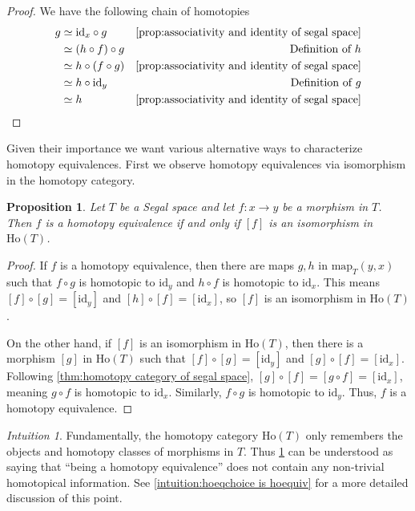 \documentclass[11pt, a4paper]{amsart}
\newcommand{\map}{\mathrm{map}}
\newcommand{\id}{\mathrm{id}}
\newcommand{\Ho}{\mathrm{Ho}}
\newtheorem{proposition}[equation]{Proposition}
\theoremstyle{definition}
\theoremstyle{remark}
\newtheorem{intuition}[equation]{Intuition}
\numberwithin{equation}{section}
\begin{document}
\begin{proof}
  We have the following chain of homotopies
  \begin{align*}
    g & \simeq \id_x \circ g  & \text{\cref{prop:associativity and identity of segal space}} \\  
      & \simeq (h \circ f) \circ g & \text{Definition of } h  \\  
      & \simeq h \circ (f \circ g) & \text{\cref{prop:associativity and identity of segal space}} \\  
      & \simeq  h \circ \id_y & \text{Definition of } g  \\  
      & \simeq h & \text{\cref{prop:associativity and identity of segal space}}
  \end{align*}  \qedhere
\end{proof}

Given their importance we want various alternative ways to characterize homotopy equivalences. First we observe homotopy equivalences via isomorphism in the homotopy category.

\begin{proposition} \label{prop:homotopy equiv iff iso in homotopy category}
  Let $T$ be a Segal space and let $f\colon x \to y$ be a morphism in $T$. Then $f$ is a homotopy equivalence if and only if $[f]$ is an isomorphism in $\Ho(T)$.
\end{proposition}

\begin{proof}
 If $f$ is a homotopy equivalence, then there are maps $g,h$ in $\map_{T}(y,x)$ such that $f \circ g$ is homotopic to $\id_y$ and $h \circ f$ is homotopic to $\id_x$. This means $[f] \circ [g] = [\id_y]$ and $[h] \circ [f] = [\id_x]$, so $[f]$ is an isomorphism in $\Ho(T)$.
 
 On the other hand, if $[f]$ is an isomorphism in $\Ho(T)$, then there is a morphism $[g]$ in $\Ho(T)$ such that $[f] \circ [g] = [\id_y]$ and $[g] \circ [f] = [\id_x]$. Following \cref{thm:homotopy category of segal space}, $[g] \circ [f] = [g\circ f] = [\id_x]$, meaning $g \circ f$ is homotopic to $\id_x$. Similarly, $f\circ g$ is homotopic to $\id_y$. Thus, $f$ is a homotopy equivalence.
\end{proof}

\begin{intuition}
  Fundamentally, the homotopy category $\Ho(T)$ only remembers the objects and homotopy classes of morphisms in $T$. Thus \cref{prop:homotopy equiv iff iso in homotopy category} can be understood as saying that ``being a homotopy equivalence'' does not contain any non-trivial homotopical information. See \cref{intuition:hoeqchoice is hoequiv} for a more detailed discussion of this point.
\end{intuition}
\end{document}

